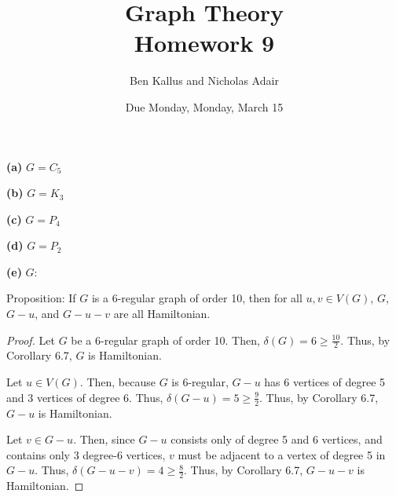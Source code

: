 \documentclass[12pt]{article}
\title{Graph Theory \\ Homework 9}
\author{Ben Kallus and Nicholas Adair}
\date{Due Monday, Monday, March 15}
\begin{document}
\maketitle


{\bf (a)} $G = C_5$

{\bf (b)} $G = K_3$

{\bf (c)} $G = P_4$

{\bf (d)} $G = P_2$

{\bf (e)} $G:$

\newpage{}

\newpage{} Proposition: If $G$ is a 6-regular graph of order 10, then for all $u,v \in V(G)$, $G$, $G - u$, and $G - u - v$ are all Hamiltonian.
\begin{proof}
	Let $G$ be a 6-regular graph of order 10.
	Then, $\delta(G) = 6 \geq \frac{10}2$.
	Thus, by Corollary 6.7, $G$ is Hamiltonian.

	Let $u \in V(G)$.
	Then, because $G$ is 6-regular, $G-u$ has 6 vertices of degree 5 and 3 vertices of degree 6.
	Thus, $\delta(G-u) = 5 \geq \frac{9}2$.
	Thus, by Corollary 6.7, $G-u$ is Hamiltonian.

	Let $v \in G-u$.
	Then, since $G-u$ consists only of degree 5 and 6 vertices, and contains only 3 degree-6 vertices, $v$ must be adjacent to a vertex of degree 5 in $G-u$.
	Thus, $\delta(G - u - v) = 4 \geq \frac{8}{2}$.
	Thus, by Corollary 6.7, $G-u-v$ is Hamiltonian.
\end{proof}

\newpage{}
\end{document}
